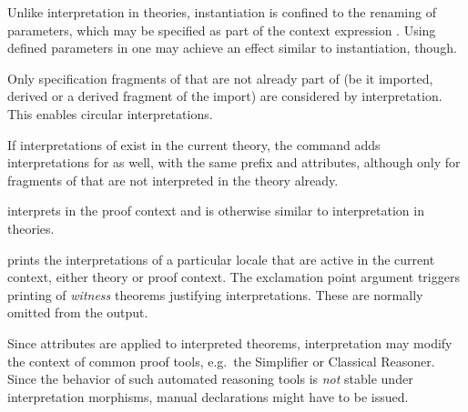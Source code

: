 \begin{isabellebody}
\begin{isamarkuptext}
\begin{descr}
  Unlike interpretation in theories, instantiation is confined to the
  renaming of parameters, which may be specified as part of the
  context expression .  Using defined parameters in  one may achieve an effect similar to instantiation, though.

  Only specification fragments of  that are not already
  part of  (be it imported, derived or a derived fragment
  of the import) are considered by interpretation.  This enables
  circular interpretations.

  If interpretations of  exist in the current theory, the
  command adds interpretations for  as well, with the same
  prefix and attributes, although only for fragments of 
  that are not interpreted in the theory already.

  \item [\hyperlink{command.interpret}{\mbox{\isa{\isacommand{interpret}}}}~\isa{{\isachardoublequote}expr\ insts\ {\isasymWHERE}\ eqns{\isachardoublequote}}]
  interprets  in the proof context and is otherwise
  similar to interpretation in theories.

  \item [\hyperlink{command.print_interps}{\mbox{\isa{\isacommand{print{\isacharunderscore}interps}}}}~\isa{loc}] prints the
  interpretations of a particular locale  that are active
  in the current context, either theory or proof context.  The
  exclamation point argument triggers printing of \emph{witness}
  theorems justifying interpretations.  These are normally omitted
  from the output.
  
  \end{descr}

  \begin{warn}
    Since attributes are applied to interpreted theorems,
    interpretation may modify the context of common proof tools, e.g.\
    the Simplifier or Classical Reasoner.  Since the behavior of such
    automated reasoning tools is \emph{not} stable under
    interpretation morphisms, manual declarations might have to be
    issued.
  \end{warn}


\end{isamarkuptext}
\end{isabellebody}
